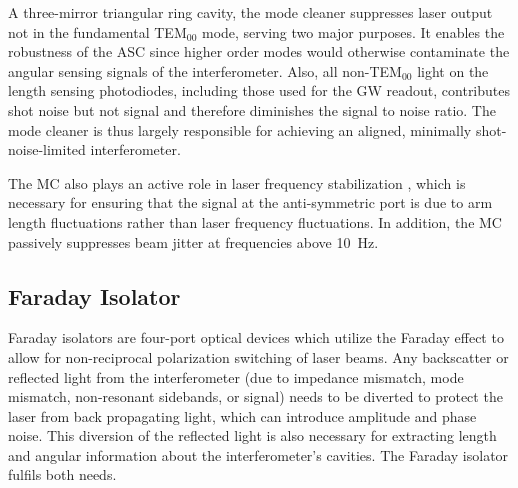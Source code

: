 A three-mirror triangular ring cavity, the mode cleaner suppresses
laser output not in the fundamental TEM$_{00}$ mode, serving two major
purposes. It enables the robustness of the ASC since higher order
modes would otherwise contaminate the angular sensing signals of the
interferometer. Also, all non-TEM$_{00}$ light on the length sensing
photodiodes, including those used for the GW readout, contributes shot
noise but not signal and therefore diminishes the signal to noise
ratio. The mode cleaner is thus largely responsible for achieving an
aligned, minimally shot-noise-limited interferometer.

The MC also plays an active role in laser frequency
stabilization \citep{Fritschel2001Readout}, which is necessary for
ensuring that the signal at the anti-symmetric port is due to arm
length fluctuations rather than laser frequency fluctuations. In
addition, the MC passively suppresses beam jitter at frequencies above
10~Hz.

 


\subsection{Faraday Isolator}
Faraday isolators are four-port optical devices which utilize the
Faraday effect to allow for non-reciprocal polarization switching of
laser beams.  Any backscatter or reflected light from the interferometer (due to
impedance mismatch, mode mismatch, non-resonant sidebands, or signal)
needs to be diverted to protect the laser from back propagating light,
which can introduce amplitude and phase noise.  This diversion of the
reflected light is also necessary for extracting length and angular
information about the interferometer's cavities. The Faraday isolator
fulfils both needs.


